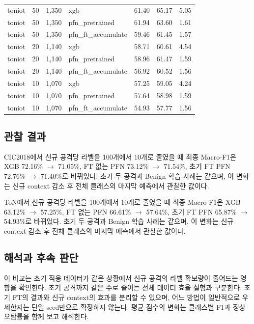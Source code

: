 \begin{longtable}
{}toniot & 50 & 1,350 & xgb & 61.40 & 65.17 & 5.05 \\
{}toniot & 50 & 1,350 & pfn\_\allowbreak{}pretrained & 61.94 & 63.60 & 1.61 \\
{}toniot & 50 & 1,350 & pfn\_\allowbreak{}ft\_\allowbreak{}accumulate & 59.46 & 61.45 & 1.57 \\
{}toniot & 20 & 1,140 & xgb & 58.71 & 60.61 & 4.54 \\
{}toniot & 20 & 1,140 & pfn\_\allowbreak{}pretrained & 58.96 & 61.47 & 1.59 \\
{}toniot & 20 & 1,140 & pfn\_\allowbreak{}ft\_\allowbreak{}accumulate & 56.92 & 60.52 & 1.56 \\
{}toniot & 10 & 1,070 & xgb & 57.25 & 59.05 & 4.24 \\
{}toniot & 10 & 1,070 & pfn\_\allowbreak{}pretrained & 57.64 & 58.98 & 1.59 \\
{}toniot & 10 & 1,070 & pfn\_\allowbreak{}ft\_\allowbreak{}accumulate & 54.93 & 57.77 & 1.56 \\
\bottomrule
\end{longtable}
\endgroup
\subsection{관찰 결과}
CIC2018에서 신규 공격당 라벨을 100개에서 10개로 줄였을 때 최종 Macro-F1은 XGB 72.16\%  \ensuremath{\rightarrow}  71.05\%, FT 없는 PFN 73.12\%  \ensuremath{\rightarrow}  71.54\%, 초기 FT PFN 72.76\%  \ensuremath{\rightarrow}  71.40\%로 바뀌었다. 초기 두 공격과 Benign 학습 사례는 같으며, 이 변화는 신규 context 감소 후 전체 클래스의 마지막 예측에서 관찰한 값이다.

ToN에서 신규 공격당 라벨을 100개에서 10개로 줄였을 때 최종 Macro-F1은 XGB 63.12\%  \ensuremath{\rightarrow}  57.25\%, FT 없는 PFN 66.61\%  \ensuremath{\rightarrow}  57.64\%, 초기 FT PFN 65.87\%  \ensuremath{\rightarrow}  54.93\%로 바뀌었다. 초기 두 공격과 Benign 학습 사례는 같으며, 이 변화는 신규 context 감소 후 전체 클래스의 마지막 예측에서 관찰한 값이다.

\subsection{해석과 후속 판단}
이 비교는 초기 적응 데이터가 같은 상황에서 신규 공격의 라벨 확보량이 줄어드는 영향을 확인한다. 초기 공격까지 같은 수로 줄이는 전체 데이터 효율 실험과 구분한다. 초기 FT의 결과와 신규 context의 효과를 분리할 수 있으며, 어느 방법이 일반적으로 우세한지는 단일 seed만으로 확정하지 않는다. 평균 점수의 변화는 클래스별 F1과 정상 오탐률을 함께 보고 해석한다.

